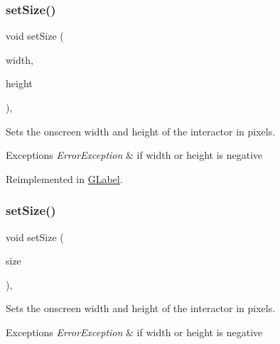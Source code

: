 \subsubsection{\texorpdfstring{set\+Size()}{setSize()}\hspace{0.1cm}{\footnotesize\ttfamily [1/2]}}
{\footnotesize\ttfamily void set\+Size (\begin{DoxyParamCaption}\item[{double}]{width,  }\item[{double}]{height }\end{DoxyParamCaption})\hspace{0.3cm}{\ttfamily [virtual]}, {\ttfamily [inherited]}}



Sets the onscreen width and height of the interactor in pixels. 


\begin{DoxyExceptions}{Exceptions}
{\em Error\+Exception} & if width or height is negative \\
\hline
\end{DoxyExceptions}


Reimplemented in \mbox{\hyperlink{classGLabel_a8ba9af72c23f52d4b93096a13a11f150}{G\+Label}}.

\mbox{\label{classGInteractor_ae2b628228f192c2702c4ce941b2af68f}} 
\subsubsection{\texorpdfstring{set\+Size()}{setSize()}\hspace{0.1cm}{\footnotesize\ttfamily [2/2]}}
{\footnotesize\ttfamily void set\+Size (\begin{DoxyParamCaption}\item[{const \mbox{\hyperlink{structGDimension}{G\+Dimension}} \&}]{size }\end{DoxyParamCaption})\hspace{0.3cm}{\ttfamily [virtual]}, {\ttfamily [inherited]}}



Sets the onscreen width and height of the interactor in pixels. 


\begin{DoxyExceptions}{Exceptions}
{\em Error\+Exception} & if width or height is negative \\
\hline
\end{DoxyExceptions}


